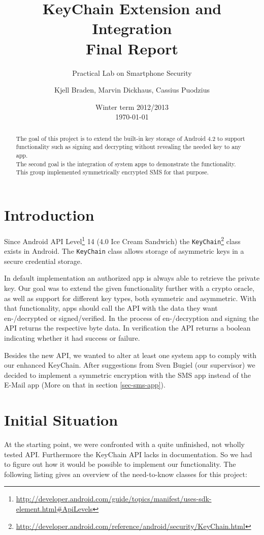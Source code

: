 \documentclass[a4paper,bibtotoc,draft]{scrartcl}
\title{KeyChain Extension and Integration\\
	Final Report}
\subtitle{Practical Lab on Smartphone Security}
\author{Kjell Braden, Marvin Dickhaus, Cassius Puodzius}
\date{Winter term 2012/2013\\\today}
\begin{document}
\maketitle

\begin{abstract}
	The goal of this project is to extend the built-in key storage of Android 4.2 to support functionality such as signing and decrypting without revealing the needed key to any app.\\
	The second goal is the integration of system apps to demonstrate the functionality. This group implemented symmetrically encrypted SMS for that purpose.
\end{abstract}

\tableofcontents


\section{Introduction}
	Since Android API Level\footnote{\url{http://developer.android.com/guide/topics/manifest/uses-sdk-element.html\#ApiLevels}} 14 (4.0 Ice Cream Sandwich) the \texttt{KeyChain}\footnote{\url{http://developer.android.com/reference/android/security/KeyChain.html}} class exists in Android. The \texttt{KeyChain} class allows storage of asymmetric keys in a secure credential storage.

	In default implementation an authorized app is always able to retrieve the private key. Our goal was to extend the given functionality further with a crypto oracle, as well as support for different key types, both symmetric and asymmetric. With that functionality, apps should call the API with the data they want en-/decrypted or signed/verified. In the process of en-/decryption and signing the API returns the respective byte data. In verification the API returns a boolean indicating whether it had success or failure.
	
	Besides the new API, we wanted to alter at least one system app to comply with our enhanced KeyChain. After suggestions from Sven Bugiel (our supervisor) we decided to implement a symmetric encryption with the SMS app instead of the E-Mail app (More on that in section \ref{sec-sms-app}).

\section{Initial Situation}
	At the starting point, we were confronted with a quite unfinished, not wholly tested API. Furthermore the KeyChain API lacks in documentation. So we had to figure out how it would be possible to implement our functionality. The following listing gives an overview of the need-to-know classes for this project:
	
\end{document}
